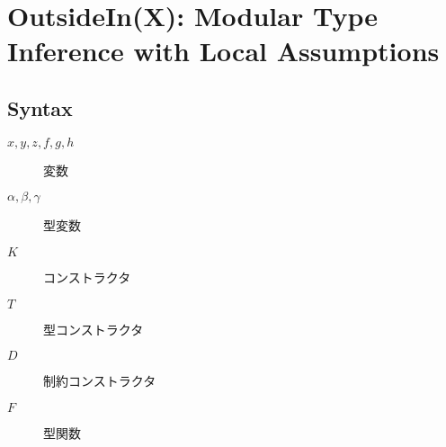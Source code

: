 \section{OutsideIn(X): Modular Type Inference with Local Assumptions}

\cite{Vytiniotis:2011}

\subsection{Syntax}

\begin{description}
  \item[$x, y, z, f, g, h$] 変数
  \item[$\alpha, \beta, \gamma$] 型変数
  \item[$K$] コンストラクタ
  \item[$T$] 型コンストラクタ
  \item[$D$] 制約コンストラクタ
  \item[$F$] 型関数
\end{description}

